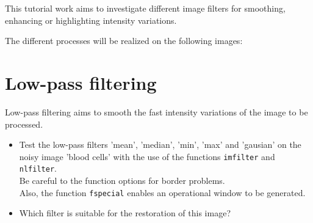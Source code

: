 \def\difficulty{1}

\begin{note}This tutorial work aims to investigate different image filters for smoothing, enhancing or highlighting intensity variations. 
\end{note}

\noindent The different processes will be realized on the following images:
\begin{figure}[h]
\begin{center}
\hspace{1cm}
\end{center}
\end{figure}


\section{Low-pass filtering}
Low-pass filtering aims to smooth the fast intensity variations of the image to be processed.
\begin{itemize}
	\item Test the low-pass filters 'mean', 'median', 'min', 'max' and 'gausian' on the noisy image 'blood cells' with the use of the \matlabregistered{} functions {\tt imfilter} and {\tt nlfilter}.\\
Be careful to the function options for border problems.\\ Also, the \matlabregistered{} function {\tt fspecial} enables an operational window to be generated.
  \item Which filter is suitable for the restoration of this image?
\end{itemize}

